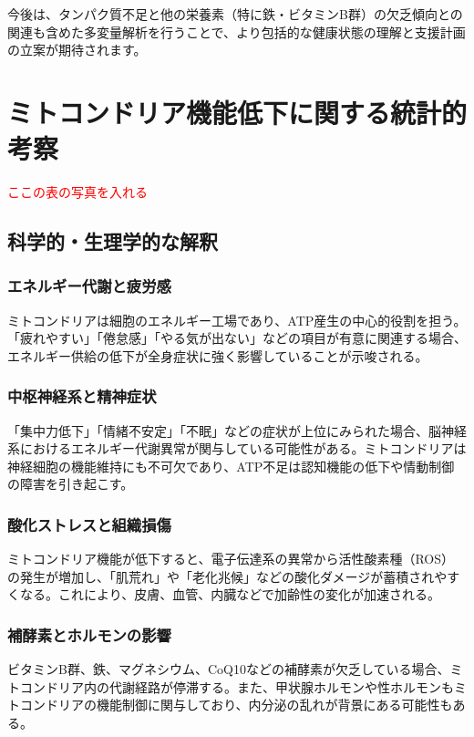 \documentclass[a4paper,12pt]{article}
\begin{document}
今後は、タンパク質不足と他の栄養素（特に鉄・ビタミンB群）の欠乏傾向との関連も含めた多変量解析を行うことで、より包括的な健康状態の理解と支援計画の立案が期待されます。


\section{ミトコンドリア機能低下に関する統計的考察}

\textcolor{red}{ここの表の写真を入れる}


\subsection*{科学的・生理学的な解釈}

\subsubsection*{エネルギー代謝と疲労感}

ミトコンドリアは細胞のエネルギー工場であり、ATP産生の中心的役割を担う。「疲れやすい」「倦怠感」「やる気が出ない」などの項目が有意に関連する場合、エネルギー供給の低下が全身症状に強く影響していることが示唆される。

\subsubsection*{中枢神経系と精神症状}

「集中力低下」「情緒不安定」「不眠」などの症状が上位にみられた場合、脳神経系におけるエネルギー代謝異常が関与している可能性がある。ミトコンドリアは神経細胞の機能維持にも不可欠であり、ATP不足は認知機能の低下や情動制御の障害を引き起こす。

\subsubsection*{酸化ストレスと組織損傷}

ミトコンドリア機能が低下すると、電子伝達系の異常から活性酸素種（ROS）の発生が増加し、「肌荒れ」や「老化兆候」などの酸化ダメージが蓄積されやすくなる。これにより、皮膚、血管、内臓などで加齢性の変化が加速される。

\subsubsection*{補酵素とホルモンの影響}

ビタミンB群、鉄、マグネシウム、CoQ10などの補酵素が欠乏している場合、ミトコンドリア内の代謝経路が停滞する。また、甲状腺ホルモンや性ホルモンもミトコンドリアの機能制御に関与しており、内分泌の乱れが背景にある可能性もある。
\end{document}
